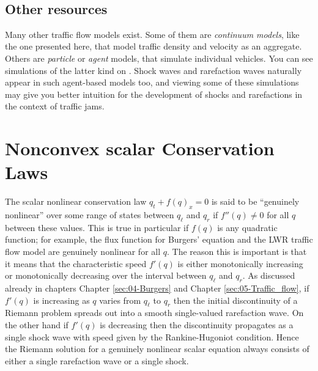 \documentclass{SIAMbook2016}
\begin{document}
    \begin{center}
    \end{center}
    { \hspace*{\fill} \\}
    
\hypertarget{other-resources}{%
\section{Other resources}\label{other-resources}}

Many other traffic flow models exist. Some of them are \emph{continuum
models}, like the one presented here, that model traffic density and
velocity as an aggregate. Others are \emph{particle} or \emph{agent}
models, that simulate individual vehicles. You can see simulations of
the latter kind on
.
Shock waves and rarefaction waves naturally appear in such agent-based
models too, and viewing some of these simulations may give you better
intuition for the development of shocks and rarefactions in the context
of traffic jams.

\hypertarget{nonconvex-scalar-conservation-laws}{%
\chapter{Nonconvex scalar Conservation
Laws}\label{nonconvex-scalar-conservation-laws}}
\label{sec:06-Nonconvex_scalar}
The scalar nonlinear conservation law \(q_t + f(q)_x = 0\) is said to be
``genuinely nonlinear'' over some range of states between \(q_\ell\) and
\(q_r\) if \(f''(q) \neq 0\) for all \(q\) between these values. This is
true in particular if \(f(q)\) is any quadratic function; for example,
the flux function for Burgers' equation and the LWR traffic flow model
are genuinely nonlinear for all \(q\). The reason this is important is
that it means that the characteristic speed \(f'(q)\) is either
monotonically increasing or monotonically decreasing over the interval
between \(q_\ell\) and \(q_r\). As discussed already in chapters
Chapter \ref{sec:04-Burgers} and Chapter \ref{sec:05-Traffic_flow}, if
\(f'(q)\) is increasing as \(q\) varies from \(q_\ell\) to \(q_r\) then
the initial discontinuity of a Riemann problem spreads out into a smooth
single-valued rarefaction wave. On the other hand if \(f'(q)\) is
decreasing then the discontinuity propagates as a single shock wave with
speed given by the Rankine-Hugoniot condition. Hence the Riemann
solution for a genuinely nonlinear scalar equation always consists of
either a single rarefaction wave or a single shock.
\end{document}
